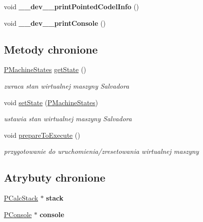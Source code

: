 \begin{CompactItemize}
\item 
\hypertarget{classPVirtualMachine_7fa0eaf24d0e5f6fa1dca0aa105d147e}{
void \textbf{\_\-\_\-dev\_\-\_\-printPointedCodelInfo} ()}
\label{classPVirtualMachine_7fa0eaf24d0e5f6fa1dca0aa105d147e}

\item 
\hypertarget{classPVirtualMachine_9fbb7c0313e22051eebfd2e316ec609b}{
void \textbf{\_\-\_\-dev\_\-\_\-printConsole} ()}
\label{classPVirtualMachine_9fbb7c0313e22051eebfd2e316ec609b}

\end{CompactItemize}
\subsection*{Metody chronione}
\begin{CompactItemize}
\item 
\hyperlink{penums_8h_3b12ec7c990da3435462047165bc0c6d}{PMachineStates} \hyperlink{classPVirtualMachine_699839f4df2106065458127c36b4bfca}{getState} ()
\begin{CompactList}\small\item\em zwraca stan wirtualnej maszyny Salvadora \item\end{CompactList}\item 
void \hyperlink{classPVirtualMachine_bede8c1e068c19b9bc61a957de70cda8}{setState} (\hyperlink{penums_8h_3b12ec7c990da3435462047165bc0c6d}{PMachineStates})
\begin{CompactList}\small\item\em ustawia stan wirtualnej maszyny Salvadora \item\end{CompactList}\item 
void \hyperlink{classPVirtualMachine_513af8673f1430cd04fd0a0e46abedd4}{prepareToExecute} ()
\begin{CompactList}\small\item\em przygotowanie do uruchomienia/zresetowania wirtualnej maszyny \item\end{CompactList}\end{CompactItemize}
\subsection*{Atrybuty chronione}
\begin{CompactItemize}
\item 
\hypertarget{classPVirtualMachine_fe929445de96589087a96a8f1188fac0}{
\hyperlink{classPCalcStack}{PCalcStack} $\ast$ \textbf{stack}}
\label{classPVirtualMachine_fe929445de96589087a96a8f1188fac0}

\item 
\hypertarget{classPVirtualMachine_67feeb2d88b4c8b766d10d6f7d8eb65b}{
\hyperlink{classPConsole}{PConsole} $\ast$ \textbf{console}}
\label{classPVirtualMachine_67feeb2d88b4c8b766d10d6f7d8eb65b}

\end{CompactItemize}


